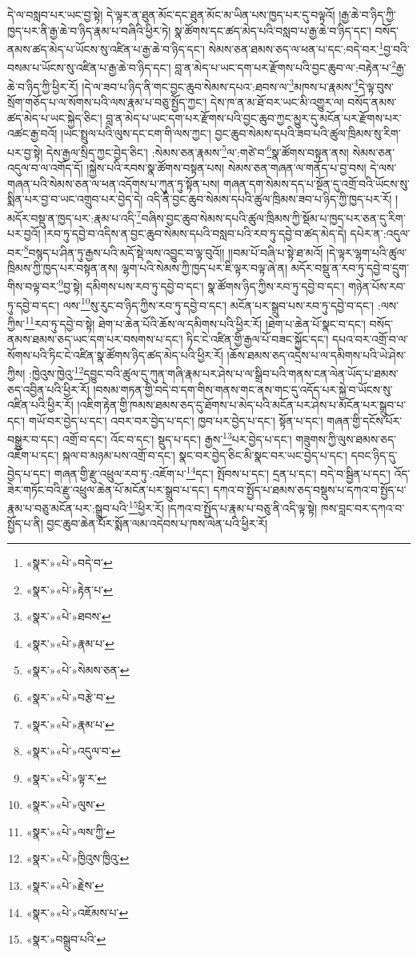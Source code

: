 དེ་ལ་བསླབ་པར་ཡང་བྱ་སྟེ། དེ་ལྟར་ན་ཐུན་མོང་དང་ཐུན་མོང་མ་ཡིན་པས་ཁྱད་པར་དུ་བལྟའོ། །རྒྱ་ཆེ་བ་ཉིད་ཀྱི་ཁྱད་པར་ནི་རྒྱ་ཆེ་བ་ཉིད་རྣམ་པ་བཞིའི་ཕྱིར་ཏེ། སྣ་ཚོགས་དང་ཚད་མེད་པའི་བསླབ་པ་རྒྱ་ཆེ་བ་ཉིད་དང་། བསོད་ནམས་ཚད་མེད་པ་ཡོངས་སུ་འཛིན་པ་རྒྱ་ཆེ་བ་ཉིད་དང་། སེམས་ཅན་ཐམས་ཅད་ལ་ཕན་པ་དང་:བདེ་བར་\footnote{«སྣར་»«པེ་»བདེ་བ་}བྱ་བའི་བསམ་པ་ཡོངས་སུ་འཛིན་པ་རྒྱ་ཆེ་བ་ཉིད་དང་། བླ་ན་མེད་པ་ཡང་དག་པར་རྫོགས་པའི་བྱང་ཆུབ་ལ་:བརྟེན་པ་\footnote{«སྣར་»«པེ་»རྟེན་པ་}རྒྱ་ཆེ་བ་ཉིད་ཀྱི་ཕྱིར་རོ། །དེ་ལ་ཟབ་པ་ཉིད་ནི་གང་བྱང་ཆུབ་སེམས་དཔའ་:ཐབས་ལ་\footnote{«སྣར་»«པེ་»ཐབས་}མཁས་པ་རྣམས་\footnote{«སྣར་»«པེ་»རྣམ་པ་}དེ་ལྟ་བུས་སྲོག་གཅོད་པ་ལ་སོགས་པའི་ལས་རྣམ་པ་བཅུ་སྤྱོད་ཀྱང་། དེས་ཁ་ན་མ་ཐོ་བར་ཡང་མི་འགྱུར་ལ། བསོད་ནམས་ཚད་མེད་པ་ཡང་སྐྱེད་ཅིང་། བླ་ན་མེད་པ་ཡང་དག་པར་རྫོགས་པའི་བྱང་ཆུབ་ཀྱང་མྱུར་དུ་མངོན་པར་རྫོགས་པར་འཚང་རྒྱ་བའོ། །ཡང་སྤྲུལ་པའི་ལུས་དང་ངག་གི་ལས་ཀྱང་། བྱང་ཆུབ་སེམས་དཔའི་ཟབ་པའི་ཚུལ་ཁྲིམས་སུ་རིག་པར་བྱ་སྟེ། དེས་རྒྱལ་སྲིད་ཀྱང་བྱེད་ཅིང་། :སེམས་ཅན་རྣམས་\footnote{«སྣར་»«པེ་»སེམས་ཅན་}ལ་:གཙེ་བ་\footnote{«སྣར་»«པེ་»བརྩེ་བ་}སྣ་ཚོགས་བསྟན་ནས། སེམས་ཅན་འདུལ་བ་ལ་འགོད་དོ། །སྐྱེས་པའི་རབས་སྣ་ཚོགས་བསྟན་པས། སེམས་ཅན་གཞན་ལ་གནོད་པ་བྱ་བས། དེ་ལས་གཞན་པའི་སེམས་ཅན་ལ་ཕན་འདོགས་པ་ཀུན་ཏུ་སྟོན་པས། གཞན་དག་སེམས་དད་པ་སྔོན་དུ་འགྲོ་བའི་ཡོངས་སུ་སྨིན་པར་བྱ་བ་ཡང་འགྲུབ་པར་བྱེད་དེ། འདི་ནི་བྱང་ཆུབ་སེམས་དཔའི་ཚུལ་ཁྲིམས་ཟབ་པ་ཉིད་ཀྱི་ཁྱད་པར་རོ། །མདོར་བསྡུ་ན་ཁྱད་པར་:རྣམ་པ་འདི་\footnote{«སྣར་»«པེ་»རྣམ་པ་}བཞིས་བྱང་ཆུབ་སེམས་དཔའི་ཚུལ་ཁྲིམས་ཀྱི་སྡོམ་པ་ཁྱད་པར་ཅན་དུ་རིག་པར་བྱའོ། །རབ་ཏུ་དབྱེ་བ་འདིས་ན་བྱང་ཆུབ་སེམས་དཔའི་བསླབ་པའི་རབ་ཏུ་དབྱེ་བ་ཚད་མེད་དེ། དཔེར་ན་:འདུལ་བར་\footnote{«སྣར་»«པེ་»འདུལ་བ་}བསྙད་པ་ཤིན་ཏུ་རྒྱས་པའི་མདོ་སྡེ་ལས་འབྱུང་བ་ལྟ་བུའོ།། །།བམ་པོ་བཞི་པ་སྟེ་ཐ་མའོ། །དེ་ལྟར་ལྷག་པའི་ཚུལ་ཁྲིམས་ཀྱི་ཁྱད་པར་བསྟན་ནས། ལྷག་པའི་སེམས་ཀྱི་ཁྱད་པར་ཇི་ལྟར་བལྟ་ཞེ་ན། མདོར་བསྡུ་ན་རབ་ཏུ་དབྱེ་བ་དྲུག་གིས་བལྟ་བར་\footnote{«སྣར་»«པེ་»ལྟ་ར་}བྱ་སྟེ། དམིགས་པས་རབ་ཏུ་དབྱེ་བ་དང་། སྣ་ཚོགས་ཉིད་ཀྱིས་རབ་ཏུ་དབྱེ་བ་དང་། གཉེན་པོས་རབ་ཏུ་དབྱེ་བ་དང་། ལས་\footnote{«སྣར་»«པེ་»ལུས་}སུ་རུང་བ་ཉིད་ཀྱིས་རབ་ཏུ་དབྱེ་བ་དང་། མངོན་པར་སྒྲུབ་པས་རབ་ཏུ་དབྱེ་བ་དང་། :ལས་ཀྱིས་\footnote{«སྣར་»«པེ་»ལས་ཀྱི་}རབ་ཏུ་དབྱེ་བ་སྟེ། ཐེག་པ་ཆེན་པོའི་ཆོས་ལ་དམིགས་པའི་ཕྱིར་རོ། །ཐེག་པ་ཆེན་པོ་སྣང་བ་དང་། བསོད་ནམས་ཐམས་ཅད་ཡང་དག་པར་བསགས་པ་དང་། ཏིང་ངེ་འཛིན་གྱི་རྒྱལ་པོ་བཟང་སྐྱོང་དང་། དཔའ་བར་འགྲོ་བ་ལ་སོགས་པའི་ཏིང་ངེ་འཛིན་སྣ་ཚོགས་ཉིད་ཚད་མེད་པའི་ཕྱིར་རོ། །ཆོས་ཐམས་ཅད་འདྲེས་པ་ལ་དམིགས་པའི་ཡེ་ཤེས་ཀྱིས། :ཁྱེའུས་ཁྱེའུ་\footnote{«སྣར་»«པེ་»ཁྱིའུས་ཁྱིའུ་}དབྱུང་བའི་ཚུལ་དུ་ཀུན་གཞི་རྣམ་པར་ཤེས་པ་ལ་སྒྲིབ་པའི་གནས་ངན་ལེན་ཡོད་པ་ཐམས་ཅད་འབྱིན་པའི་ཕྱིར་རོ། །བསམ་གཏན་གྱི་བདེ་བ་དག་གིས་གནས་གང་ནས་གང་དུ་འདོད་པར་སྐྱེ་བ་ཡོངས་སུ་འཛིན་པའི་ཕྱིར་རོ། །འཇིག་རྟེན་གྱི་ཁམས་ཐམས་ཅད་དུ་ཐོགས་པ་མེད་པའི་མངོན་པར་ཤེས་པ་མངོན་པར་སྒྲུབ་པ་དང་། གཡོ་བར་བྱེད་པ་དང་། འབར་བར་བྱེད་པ་དང་། ཁྱབ་པར་བྱེད་པ་དང་། སྟོན་པ་དང་། གཞན་གྱི་དངོས་པོར་བསྒྱུར་བ་དང་། འགྲོ་བ་དང་། འོང་བ་དང་། སྡུད་པ་དང་། རྒྱས་\footnote{«སྣར་»«པེ་»རྗེས་}པར་བྱེད་པ་དང་། གཟུགས་ཀྱི་ལུས་ཐམས་ཅད་འཇོག་པ་དང་། སྐལ་བ་མཉམ་པས་འགྲོ་བ་དང་། སྣང་བར་བྱེད་ཅིང་མི་སྣང་བར་ཡང་བྱེད་པ་དང་། དབང་ཉིད་དུ་བྱེད་པ་དང་། གཞན་གྱི་རྫུ་འཕྲུལ་རབ་ཏུ་:འཇོག་པ་\footnote{«སྣར་»«པེ་»འཇོམས་པ་}དང་། སྤོབས་པ་དང་། དྲན་པ་དང་། བདེ་བ་སྦྱིན་པ་དང་། འོད་ཟེར་གཏོང་བའི་རྫུ་འཕྲུལ་ཆེན་པོ་མངོན་པར་སྒྲུབ་པ་དང་། དཀའ་བ་སྤྱོད་པ་ཐམས་ཅད་བསྡུས་པ་དཀའ་བ་སྤྱོད་པ་རྣམ་པ་བཅུ་མངོན་པར་:སྒྲུབ་པའི་\footnote{«སྣར་»བསྒྲུབ་པའི་}ཕྱིར་རོ། །དཀའ་བ་སྤྱོད་པ་རྣམ་པ་བཅུ་ནི་འདི་ལྟ་སྟེ། ཁས་བླང་བར་དཀའ་བ་སྤྱོད་པ་ནི། བྱང་ཆུབ་ཆེན་པོར་སྨོན་ལམ་འདེབས་པ་ཁས་ལེན་པའི་ཕྱིར་རོ། 